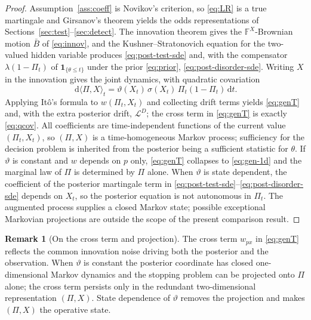 \documentclass[pdflatex,sn-mathphys-num]{sn-jnl}
\theoremstyle{plain}
\theoremstyle{definition}
\newtheorem{remark}[theorem]{Remark}
\newcommand{\Filt}{\mathbb{F}}
\newcommand{\Lgen}{\mathscr{L}}
\newcommand{\ind}{\mathbf{1}}
\newcommand{\dd}{\,\mathrm{d}}
\newcommand{\snr}{\vartheta}
\newcommand{\post}{\Pi}
\newcommand{\bbar}{\bar{B}}
\begin{document}
\begin{proof}
Assumption~\ref{ass:coeff} is Novikov's criterion, so \eqref{eq:LR} is a true
martingale and Girsanov's theorem yields the odds representations of
Sections~\ref{sec:test}--\ref{sec:detect}. The innovation theorem
\citep{liptser1977statistics} gives the $\Filt^X$-Brownian motion $\bbar$ of
\eqref{eq:innov}, and the Kushner--Stratonovich equation for the two-valued hidden
variable produces \eqref{eq:post-test-sde} and, with the compensator
$\lambda(1-\post_t)$ of $\ind_{\{\theta\le t\}}$ under the prior \eqref{eq:prior},
\eqref{eq:post-disorder-sde}. Writing $X$ in the innovation gives the joint
dynamics, with quadratic covariation
\begin{equation}\label{eq:qcov}
  \dd\langle\post,X\rangle_t=\snr(X_t)\,\sigma(X_t)\,\post_t(1-\post_t)\dd t.
\end{equation}
Applying It\^o's formula to $w(\post_t,X_t)$ and collecting drift terms yields
\eqref{eq:genT} and, with the extra posterior drift, $\Lgen^{D}$; the cross term
in \eqref{eq:genT} is exactly \eqref{eq:qcov}. All coefficients are
time-independent functions of the current value $(\post_t,X_t)$, so $(\post,X)$ is
a time-homogeneous Markov process; sufficiency for the decision problem is
inherited from the posterior being a sufficient statistic for $\theta$. If $\snr$
is constant and $w$ depends on $p$ only, \eqref{eq:genT} collapses to
\eqref{eq:gen-1d} and the marginal law of $\post$ is determined by $\post$ alone.
When $\snr$ is state dependent, the coefficient of the posterior martingale term
in \eqref{eq:post-test-sde}--\eqref{eq:post-disorder-sde} depends on $X_t$, so the
posterior equation is not autonomous in $\post_t$. The augmented process supplies
a closed Markov state; possible exceptional Markovian projections are outside the
scope of the present comparison result.
\end{proof}

\begin{remark}[On the cross term and projection]\label{rem:crossterm}
The cross term $w_{px}$ in \eqref{eq:genT} reflects the common innovation noise
driving both the posterior and the observation. When $\snr$ is constant the
posterior coordinate has closed one-dimensional Markov dynamics and the stopping
problem can be projected onto $\post$ alone; the cross term persists only in the
redundant two-dimensional representation $(\post,X)$. State dependence of $\snr$
removes the projection and makes $(\post,X)$ the operative state.
\end{remark}
\end{document}
